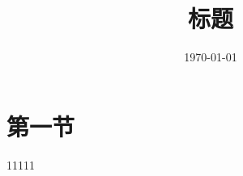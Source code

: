 \documentclass[11pt]{article}
\title{\vspace{-2em}\textbf{标题}}
\author{}
\date{\today}
\begin{document}
\maketitle
\tableofcontents
\section{第一节}
11111
\end{document}
